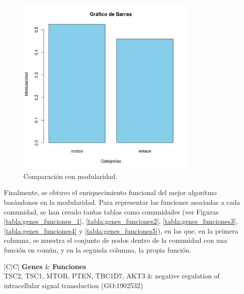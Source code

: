 \begin{figure}
  \centering
  \includegraphics[width=0.8\textwidth]{figures/comparacion_grafos.png}
  \caption{Comparación con modularidad.}
  \label{fig:comparacion_grafos}
\end{figure}

Finalmente, se obtuvo el enriquecimiento funcional del mejor algoritmo basándonos en la modularidad. Para representar las funciones asociadas a cada comunidad, se han creado tantas tablas como comunidades (ver Figuras \ref{tabla:genes_funciones_1}, \ref{tabla:genes_funciones2},  \ref{tabla:genes_funciones3}, \ref{tabla:genes_funciones4} y \ref{tabla:genes_funciones5}), en las que, en la primera columna, se muestra el conjunto de nodos dentro de la comunidad con una función en común, y en la segunda columna, la propia función.

\begin{table}[!]
    \label{tabla:genes_funciones_1}
 	\caption{Descripción de Genes y Funciones de la comunidad 1}
	\centering
	\begin{tabular}{|C|C|}
    \toprule
    \textbf{Genes} & \textbf{Funciones} \\
    \midrule
    TSC2, TSC1, MTOR, PTEN, TBC1D7, AKT3 & negative regulation of intracellular signal transduction (GO:1902532) \\
    \bottomrule
 	\end{tabular}
\end{table}

